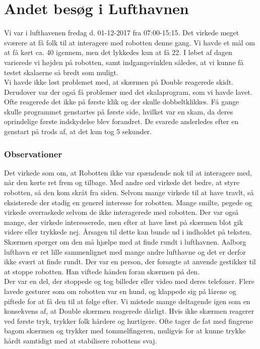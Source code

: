 \section{Andet besøg i Lufthavnen}
\label{TestAfSkalaLufthavnsBesog}
%
Vi var i lufthavenen fredag d. 01-12-2017 fra 07:00-15:15. Det virkede meget sværere at få folk til at interagere med robotten denne gang. Vi havde et mål om at få kørt ca. 40 igennem, men det lykkedes kun at få 22. I løbet af dagen varierede vi højden på robotten, samt indgangsvinklen således, at vi kunne få testet skalaerne så bredt som muligt.\\
Vi havde ikke løst problemet med, at skærmen på Double reagerede skidt. Derudover var der også få problemer med det skalaprogram, som vi havde lavet. Ofte reagerede det ikke på første klik og der skulle dobbeltklikkes. Få gange skulle programmet genstartes på første side, hvilket var en skam, da deres oprindelige første indskydelse blev forandret. De svarede anderledes efter en genstart på trods af, at det kun tog 5 sekunder.



\subsubsection{Observationer}
Det virkede som om, at Robotten ikke var spændende nok til at interagere med, når den kørte ret frem og tilbage. Med andre ord virkede det bedre, at styre robotten, så den kom skråt fra siden.
Selvom mange virkede til at have travlt, så eksisterede der stadig en generel interesse for robotten. Mange smilte, pegede og virkede overraskede selvom de ikke interagerede med robotten. Der var også mange, der virkede interesserede, men efter at have læst på skærmen blot gik videre eller trykkede nej. Årsagen til dette kan bunde ud i indholdet på teksten. Skærmen spørger om den må hjælpe med at finde rundt i lufthavnen. Aalborg lufthavn er ret lille sammenlignet med mange andre lufthavne og det er derfor ikke svært at finde rundt. Der var en person, der forsøgte at anvende gestikker til at stoppe robotten. Han viftede hånden foran skærmen på den.\\
Der var en del, der stoppede og tog billeder eller video med deres telefoner. Flere lavede gesturer som om robotten var en hund, og klappede sig på lårene og piftede for at få den til at følge efter. Vi mistede mange deltagende igen som en konsekvens af, at Double skærmen reagerede dårligt. Hvis ikke skærmen reagerer ved første tryk, trykker folk hårdere og hurtigere. Ofte tager de fat med fingrene bagom skærmen og trykker med tommelfingeren, muligvis for at kunne trykke hårdt samtidigt med at stabilisere robottens svaj.

